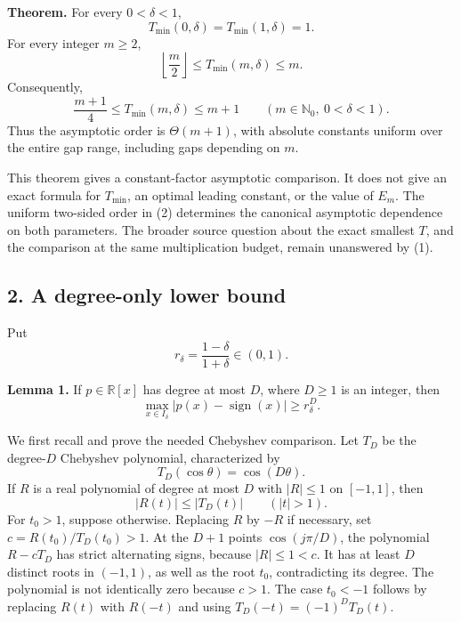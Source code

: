 \documentclass[10pt,a4paper]{article}
\begin{document}
\textbf{Theorem.} For every \(0<\delta<1\), \[
T_{\min}(0,\delta)=T_{\min}(1,\delta)=1.
\] For every integer \(m\ge2\), \[
\left\lfloor\frac m2\right\rfloor
\le T_{\min}(m,\delta)\le m.
\tag{1}
\] Consequently, \[
\frac{m+1}{4}\le T_{\min}(m,\delta)\le m+1
\qquad(m\in\mathbb N_0,\ 0<\delta<1).
\tag{2}
\] Thus the asymptotic order is \(\Theta(m+1)\), with absolute constants
uniform over the entire gap range, including gaps depending on \(m\).

This theorem gives a constant-factor asymptotic comparison. It does not
give an exact formula for \(T_{\min}\), an optimal leading constant, or
the value of \(E_m\). The uniform two-sided order in (2) determines the
canonical asymptotic dependence on both parameters. The broader source
question about the exact smallest \(T\), and the comparison at the same
multiplication budget, remain unanswered by (1).


\subsection{2. A degree-only lower
bound}\label{a-degree-only-lower-bound}

Put \[
r_\delta=\frac{1-\delta}{1+\delta}\in(0,1).
\]

\textbf{Lemma 1.} If \(p\in\mathbb R[x]\) has degree at most \(D\),
where \(D\ge1\) is an integer, then \[
\max_{x\in I_\delta}|p(x)-\operatorname{sign}(x)|
\ge r_\delta^D.
\tag{3}
\]

We first recall and prove the needed Chebyshev comparison. Let \(T_D\)
be the degree-\(D\) Chebyshev polynomial, characterized by \[
T_D(\cos\theta)=\cos(D\theta).
\] If \(R\) is a real polynomial of degree at most \(D\) with
\(|R|\le1\) on \([-1,1]\), then \[
|R(t)|\le |T_D(t)|\qquad(|t|>1).
\tag{4}
\] For \(t_0>1\), suppose otherwise. Replacing \(R\) by \(-R\) if
necessary, set \(c=R(t_0)/T_D(t_0)>1\). At the \(D+1\) points
\(\cos(j\pi/D)\), the polynomial \(R-cT_D\) has strict alternating
signs, because \(|R|\le1<c\). It has at least \(D\) distinct roots in
\((-1,1)\), as well as the root \(t_0\), contradicting its degree. The
polynomial is not identically zero because \(c>1\). The case \(t_0<-1\)
follows by replacing \(R(t)\) with \(R(-t)\) and using
\(T_D(-t)=(-1)^DT_D(t)\).
\end{document}
